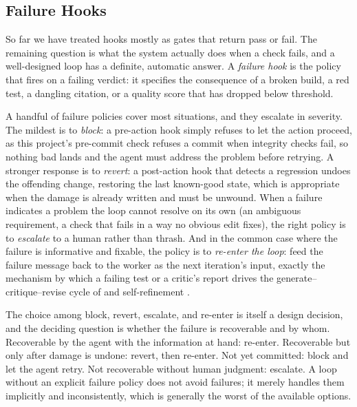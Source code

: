 \subsection{Failure Hooks}\label{subsec:failure-hooks}

So far we have treated hooks mostly as gates that return pass or fail. The remaining question is what the system actually does when a check fails, and a well-designed loop has a definite, automatic answer. A \emph{failure hook} is the policy that fires on a failing verdict: it specifies the consequence of a broken build, a red test, a dangling citation, or a quality score that has dropped below threshold.

A handful of failure policies cover most situations, and they escalate in severity. The mildest is to \emph{block}: a pre-action hook simply refuses to let the action proceed, as this project's pre-commit check refuses a commit when integrity checks fail, so nothing bad lands and the agent must address the problem before retrying. A stronger response is to \emph{revert}: a post-action hook that detects a regression undoes the offending change, restoring the last known-good state, which is appropriate when the damage is already written and must be unwound. When a failure indicates a problem the loop cannot resolve on its own (an ambiguous requirement, a check that fails in a way no obvious edit fixes), the right policy is to \emph{escalate} to a human rather than thrash. And in the common case where the failure is informative and fixable, the policy is to \emph{re-enter the loop}: feed the failure message back to the worker as the next iteration's input, exactly the mechanism by which a failing test or a critic's report drives the generate--critique--revise cycle of  and self-refinement \cite{madaan2023selfrefine}.

\begin{remark}
The choice among block, revert, escalate, and re-enter is itself a design decision, and the deciding question is whether the failure is recoverable and by whom. Recoverable by the agent with the information at hand: re-enter. Recoverable but only after damage is undone: revert, then re-enter. Not yet committed: block and let the agent retry. Not recoverable without human judgment: escalate. A loop without an explicit failure policy does not avoid failures; it merely handles them implicitly and inconsistently, which is generally the worst of the available options.
\end{remark}

